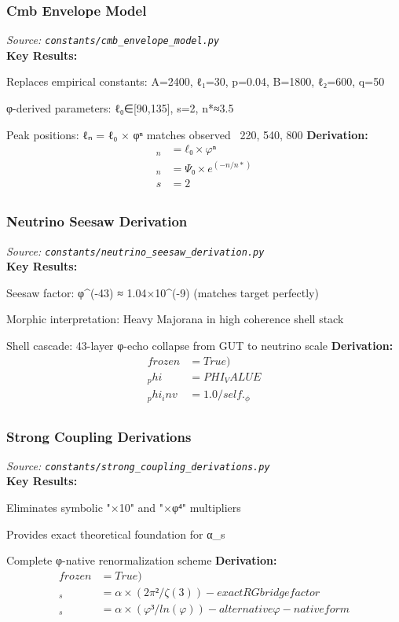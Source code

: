 
\subsubsection{Cmb Envelope Model}
\textit{Source: \texttt{constants/cmb_envelope_model.py}}\\

\textbf{Key Results:}
\item Replaces empirical constants: A=2400, ℓ₁=30, p=0.04, B=1800, ℓ₂=600, q=50
\item φ-derived parameters: ℓ₀∈[90,135], s=2, n*≈3.5
\item Peak positions: ℓₙ = ℓ₀ × φⁿ matches observed ~220, 540, 800
\textbf{Derivation:}
\begin{align}
_n &= ℓ₀ × φⁿ \\
_n &= Ψ₀ × e^(-n/n*) \\
s &= 2 \\
\end{align}

\subsubsection{Neutrino Seesaw Derivation}
\textit{Source: \texttt{constants/neutrino_seesaw_derivation.py}}\\

\textbf{Key Results:}
\item Seesaw factor: φ^(-43) ≈ 1.04×10^(-9) (matches target perfectly)
\item Morphic interpretation: Heavy Majorana in high coherence shell stack
\item Shell cascade: 43-layer φ-echo collapse from GUT to neutrino scale
\textbf{Derivation:}
\begin{align}
frozen &= True) \\
_phi &= PHI_VALUE \\
_phi_inv &= 1.0 / self._\phi \\
\end{align}

\subsubsection{Strong Coupling Derivations}
\textit{Source: \texttt{constants/strong_coupling_derivations.py}}\\

\textbf{Key Results:}
\item Eliminates symbolic "×10" and "×φ⁴" multipliers
\item Provides exact theoretical foundation for α_s
\item Complete φ-native renormalization scheme
\textbf{Derivation:}
\begin{align}
frozen &= True) \\
_s &= α × (2π²/ζ(3)) - exact RG bridge factor \\
_s &= α × (φ³/ln(φ)) - alternative φ-native form \\
\end{align}

